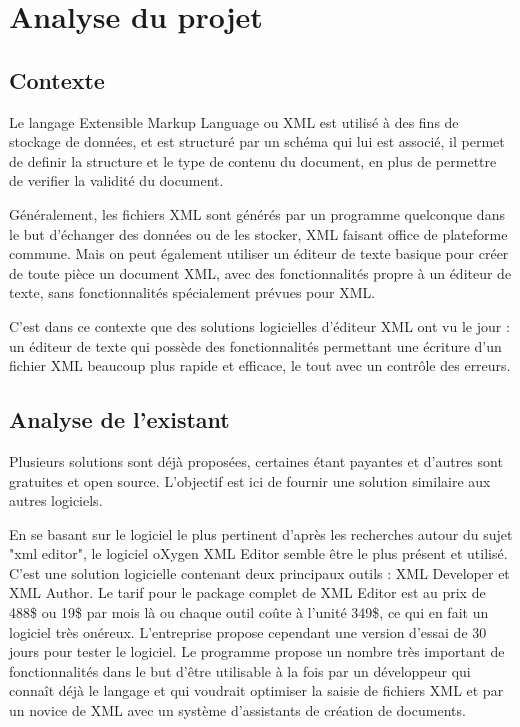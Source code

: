 \chapter{Analyse du projet}
	\section{Contexte}
	Le langage Extensible Markup Language ou XML est utilisé à des fins de stockage de données, et est structuré par un schéma qui lui est associé, il permet de definir la structure et le type de contenu du document, en plus de permettre de verifier la validité du document.

	Généralement, les fichiers XML sont générés par un programme quelconque dans le but d'échanger des données ou de les stocker, XML faisant office de plateforme commune. Mais on peut également utiliser un éditeur de texte basique pour créer de toute pièce un document XML, avec des fonctionnalités propre à un éditeur de texte, sans fonctionnalités spécialement prévues pour XML.
	
	C'est dans ce contexte que des solutions logicielles d'éditeur XML ont vu le jour : un éditeur de texte qui possède des fonctionnalités permettant une écriture d'un fichier XML beaucoup plus rapide et efficace, le tout avec un contrôle des erreurs.
	
	\section{Analyse de l'existant}
	Plusieurs solutions sont déjà proposées, certaines étant payantes et d'autres sont gratuites et open source. L'objectif est ici de fournir une solution similaire aux autres logiciels.
	
	En se basant sur le logiciel le plus pertinent d'après les recherches autour du sujet "xml editor", le logiciel oXygen XML Editor semble être le plus présent et utilisé. C'est une solution logicielle contenant deux principaux outils : XML Developer et XML Author. Le tarif pour le package complet de XML Editor est au prix de 488\$ ou 19\$ par mois là ou chaque outil coûte à l'unité 349\$, ce qui en fait un logiciel très onéreux. L'entreprise propose cependant une version d'essai de 30 jours pour tester le logiciel. Le programme propose un nombre très important de fonctionnalités dans le but d'être utilisable à la fois par un développeur qui connaît déjà le langage et qui voudrait optimiser la saisie de fichiers XML et par un novice de XML avec un système d'assistants de création de documents.
	
